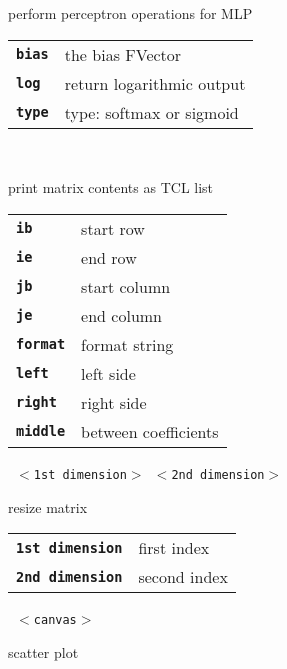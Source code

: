 \begin{description}
\begin{description}
        perform perceptron operations for MLP

      \begin{tabular}{ll}
 \texttt{\textbf{bias}} &  the bias FVector \\
 \texttt{\textbf{log}} &   return logarithmic output  \\
 \texttt{\textbf{type}} &  type: softmax or sigmoid  \\
      \end{tabular}
       \texttt{        } \

        print matrix contents as TCL list

      \begin{tabular}{ll}
 \texttt{\textbf{ib}} &      start row  \\
 \texttt{\textbf{ie}} &      end row  \\
 \texttt{\textbf{jb}} &      start column  \\
 \texttt{\textbf{je}} &      end column  \\
 \texttt{\textbf{format}} &  format string  \\
 \texttt{\textbf{left}} &    left side  \\
 \texttt{\textbf{right}} &   right side  \\
 \texttt{\textbf{middle}} &  between coefficients  \\
      \end{tabular}
       \texttt{ $<$1st dimension$>$ $<$2nd dimension$>$} \

        resize matrix

      \begin{tabular}{ll}
 \texttt{\textbf{1st dimension}} &  first index  \\
 \texttt{\textbf{2nd dimension}} &  second index  \\
      \end{tabular}
       \texttt{ $<$canvas$>$               } \

        scatter plot


\end{description}
\end{description}
